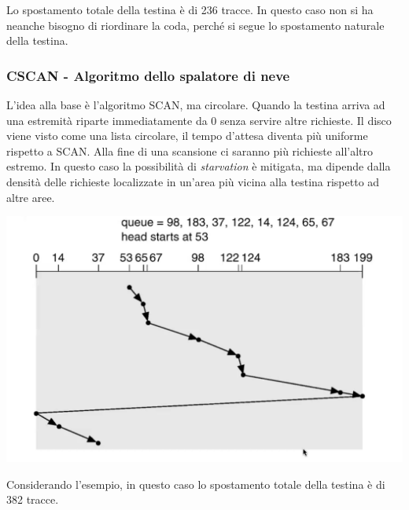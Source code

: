 \documentclass[a4paper,12pt, twoside]{report}
\begin{document}
Lo spostamento totale della testina \`e di 236 tracce. In questo caso non si ha neanche bisogno di riordinare
la coda, perch\'e si segue lo spostamento naturale della testina. 

\subsubsection{CSCAN - Algoritmo dello spalatore di neve}

L'idea alla base \`e l'algoritmo SCAN, ma circolare. Quando la testina arriva ad una estremit\`a riparte
immediatamente da 0 senza servire altre richieste. Il disco viene visto come una lista circolare, il tempo 
d'attesa diventa pi\`u uniforme rispetto a SCAN. Alla fine di una scansione ci saranno pi\`u richieste
all'altro estremo. In questo caso la possibilit\`a di \emph{starvation} \`e mitigata, ma dipende dalla 
densit\`a delle richieste localizzate in un'area pi\`u vicina alla testina rispetto ad altre aree. 
\begin{center}
    \includegraphics[scale=0.2]{cscan_disk}
\end{center}
Considerando l'esempio, in questo caso lo spostamento totale della testina \`e di 382 tracce.

\end{document}
